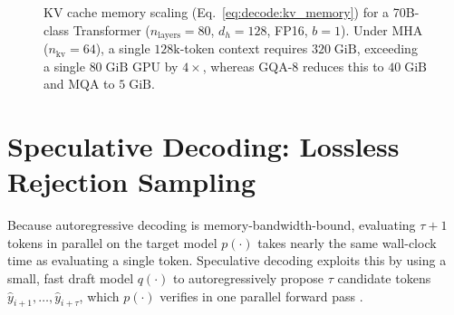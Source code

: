 \documentclass[../../../../master.tex]{subfiles}
\begin{document}
\begin{figure}[htbp]
\caption{KV cache memory scaling (Eq.~\eqref{eq:decode:kv_memory}) for a 70B-class Transformer ($n_{\mathrm{layers}}=80$, $d_h=128$, FP16, $b=1$). Under MHA ($n_{\mathrm{kv}}=64$), a single $128\mathrm{k}$-token context requires $320\;\mathrm{GiB}$, exceeding a single $80\;\mathrm{GiB}$ GPU by $4\times$, whereas GQA-8 reduces this to $40\;\mathrm{GiB}$ and MQA to $5\;\mathrm{GiB}$.}\label{fig:decode:kv_memory_scaling}
\end{figure}

\section{Speculative Decoding: Lossless Rejection Sampling}\label{sec:decode:speculative}

Because autoregressive decoding is memory-bandwidth-bound, evaluating $\tau + 1$ tokens in parallel on the target model $p(\cdot)$ takes nearly the same wall-clock time as evaluating a single token. Speculative decoding exploits this by using a small, fast draft model $q(\cdot)$ to autoregressively propose $\tau$ candidate tokens $\hat{y}_{i+1}, \dots, \hat{y}_{i+\tau}$, which $p(\cdot)$ verifies in one parallel forward pass .
\end{document}
